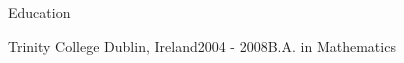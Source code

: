 \documentclass{resume} %
\begin{document}
\begin{rSection}{Education}
\begin{rSubsection}{Trinity College Dublin, Ireland}{2004 - 2008}{B.A. in Mathematics}{}

\end{rSubsection}
\end{rSection}



%
%





\end{document}

